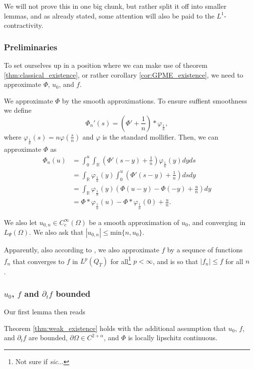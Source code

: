 \documentclass[11pt, a4paper]{article}
\begin{document}
We will not prove this in one big chunk, but rather split it off into smaller lemmas, and as already stated, some attention will also be paid to the $L^1$-contractivity.
\subsubsection{Preliminaries}
To set ourselves up in a position where we can make use of theorem \ref{thm:classical_existence}, or rather corollary \ref{cor:GPME_existence}, we need to approximate $\Phi$, $u_0$, and $f$.

We approximate $\Phi$ by the smooth approximations. To ensure suffient smoothness we define
\begin{equation*}
\Phi_n'(s) = \left( \Phi' + \frac{1}{n}\right)*\varphi_{\frac{1}{n}},
\end{equation*}
where $\varphi_{\frac{1}{n}}(s) = n\varphi\left( \frac{s}{n} \right)$ and $\varphi$ is the standard mollifier. Then, we can approximate $\Phi$ as
\begin{align*}
\Phi_n(u) &= \int_0^u \int_\mathbb{R}\left( \Phi'(s-y) + \frac{1}{n}\right)\varphi_{\frac{1}{n}}(y)dyds \\
&= \int_\mathbb{R}\varphi_{\frac{1}{n}}(y) \int_0^u \left( \Phi'(s-y) + \frac{1}{n}\right)dsdy \\
&= \int_\mathbb{R}\varphi_{\frac{1}{n}}(y) \left( \Phi(u-y) - \Phi(-y) + \frac{u}{n}\right)dy \\
&= \Phi * \varphi_{\frac{1}{n}}(u) - \Phi * \varphi_{\frac{1}{n}}(0) + \frac{u}{n}.
\end{align*}




We also let $u_{0,n}\in C^\infty_c(\Omega)$ be a smooth approximation of $u_0$, and converging in $L_\Psi(\Omega)$. We also ask that $|u_{0,n}| \leq $min$\{n,u_0\}$.

Apparently, also according to \citep{vazquez2007porous}, we also approximate $f$ by a sequnce of functions $f_n$ that converges to $f$ in $L^p(Q_T)$ for all\footnote{Not sure if \textit{sic}...} $p<\infty$, and is so that $|f_n| \leq f$ for all $n$.

\subsubsection{$u_0$, $f$ and $\partial_t f$ bounded}
Our first lemma then reads
\begin{lemma}
Theorem \ref{thm:weak_existence} holds with the additional assumption that $u_0$, $f$, and $\partial_t f$ are bounded, $\partial \Omega \in C^{2+\alpha}$, and $\Phi$ is locally lipschitz continuous.
\end{lemma}
\end{document}
